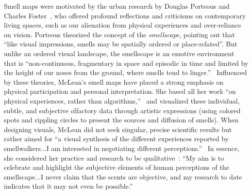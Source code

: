 Smell maps were motivated by the urban research by Douglas Porteous and Charles Foster~\cite{mclean2019nose}, who offered profound reflections and criticisms on contemporary living spaces, such as our alienation from physical experiences and over-reliance on vision.
Porteous theorized the concept of the \textit{smellscape}, pointing out that ``like visual impressions, smells may be spatially ordered or place-related''. But unlike an ordered visual landscape, the smellscape is an emotive environment that is ``non-continuous, fragmentary in space and episodic in time and limited by the height of our noses from the ground, where smells tend to linger.''~\cite{porteous1985smellscape}
Influenced by these theories, McLean's smell maps have placed a strong emphasis on physical participation and personal interpretation. She based all her work ``on physical experiences, rather than algorithms,''~\cite{cnn} and visualized these individual, subtle, and subjective olfactory data through artistic expressions (\eg using colored spots and rippling circles to present the sources and diffusion of smells). 
When designing visuals, McLean did not seek singular, precise scientific results but rather aimed for ``a visual synthesis of the different experiences reported by smellwalkers...I am interested in negotiating different perceptions.''~\cite{atlas}
In essence, she considered her practice and research to be qualitative~\cite{marie}: ``My aim is to celebrate and highlight the subjective elements of human perceptions of the smellscape...I never claim that the scents are objective, and my research to date indicates that it may not even be possible.''




